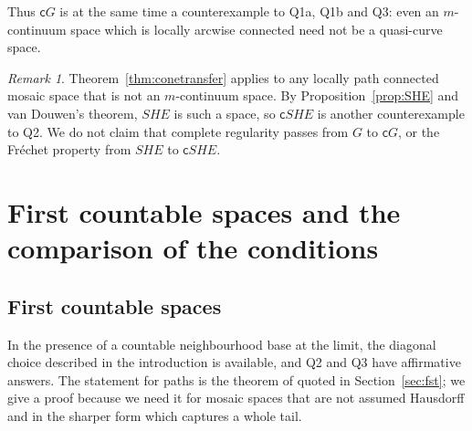 \documentclass[11pt]{amsart}
\theoremstyle{definition}
\theoremstyle{remark}
\newtheorem{remark}[theorem]{Remark}
\newcommand{\cone}{\mathsf{c}}
\newcommand{\SHE}{\mathit{SHE}}
\numberwithin{equation}{section}
\begin{document}
Thus $\cone G$ is at the same time a counterexample to Q1a, Q1b and Q3: even an $m$-continuum space which is locally arcwise connected need not be a quasi-curve space.

\begin{remark}\label{rem:coneSHE}
Theorem~\ref{thm:conetransfer} applies to any locally path connected mosaic space that is not an $m$-continuum space. By Proposition~\ref{prop:SHE} and van Douwen's theorem, $\SHE$ is such a space, so $\cone\SHE$ is another counterexample to Q2. We do not claim that complete regularity passes from $G$ to $\cone G$, or the Fr\'echet property from $\SHE$ to $\cone\SHE$.
\end{remark}

\section{First countable spaces and the comparison of the conditions}\label{sec:fc}

\subsection{First countable spaces}
In the presence of a countable neighbourhood base at the limit, the diagonal choice described in the introduction is available, and Q2 and Q3 have affirmative answers. The statement for paths is the theorem of \cite{fst79} quoted in Section~\ref{sec:fst}; we give a proof because we need it for mosaic spaces that are not assumed Hausdorff and in the sharper form which captures a whole tail.
\end{document}
